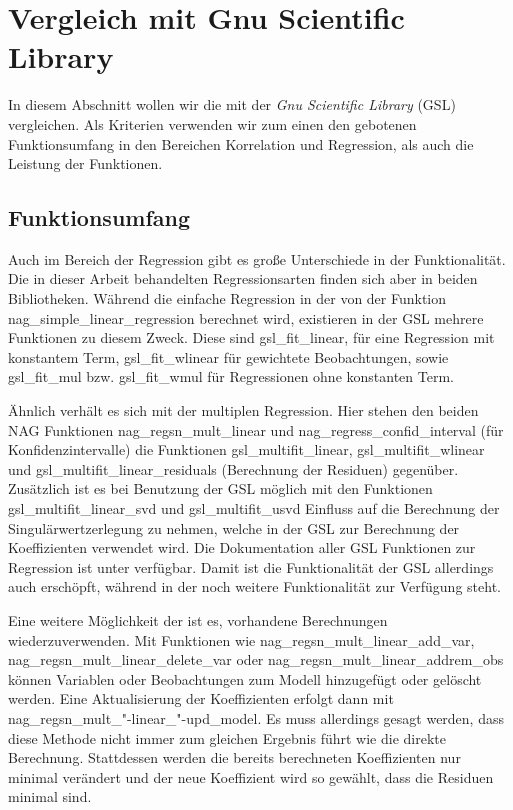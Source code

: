 \section{Vergleich mit Gnu Scientific Library}

In diesem Abschnitt wollen wir die \naglib mit der {\it Gnu Scientific Library} (GSL) vergleichen.
Als Kriterien verwenden wir zum einen den gebotenen Funktionsumfang in den Bereichen Korrelation und Regression, als auch die Leistung der Funktionen.


\subsection{Funktionsumfang}
\label{sec:funktionsumfang}


Auch im Bereich der Regression gibt es große Unterschiede in der Funktionalität.
Die in dieser Arbeit behandelten Regressionsarten finden sich aber in beiden Bibliotheken.
Während die einfache Regression in der \naglib von der Funktion nag\_simple\_linear\_regression berechnet wird, existieren in der GSL mehrere Funktionen zu diesem Zweck.
Diese sind gsl\_fit\_linear, für eine Regression mit konstantem Term, gsl\_fit\_wlinear für gewichtete Beobachtungen, sowie gsl\_fit\_mul bzw. gsl\_fit\_wmul für Regressionen ohne konstanten Term.

Ähnlich verhält es sich mit der multiplen Regression.
Hier stehen den beiden NAG Funktionen nag\_regsn\_mult\_linear und nag\_regress\_confid\_interval (für Konfidenzintervalle) die Funktionen  gsl\_multifit\_linear, gsl\_multifit\_wlinear und gsl\_multifit\_linear\_residuals (Berechnung der Residuen) gegenüber.
Zusätzlich ist es bei Benutzung der GSL möglich mit den Funktionen gsl\_multifit\_linear\_svd und gsl\_multifit\_usvd Einfluss auf die Berechnung der Singulärwertzerlegung zu nehmen, welche in der GSL zur Berechnung der Koeffizienten verwendet wird.
Die Dokumentation aller GSL Funktionen zur Regression ist unter \cite{FreeSoftwareFoundation2011} verfügbar.
Damit ist die Funktionalität der GSL allerdings auch erschöpft, während in der \naglib noch weitere Funktionalität zur Verfügung steht.

Eine weitere Möglichkeit der \naglib ist es, vorhandene Berechnungen wiederzuverwenden.
Mit Funktionen wie nag\_regsn\_mult\_linear\_add\_var, nag\_regsn\_mult\_linear\_delete\_var oder nag\_regsn\_mult\_linear\_addrem\_obs können Variablen oder Beobachtungen zum Modell hinzugefügt oder gelöscht werden.
Eine Aktualisierung der Koeffizienten erfolgt dann mit nag\_regsn\_mult\_"-linear\_"-upd\_model.
Es muss allerdings gesagt werden, dass diese Methode nicht immer zum gleichen Ergebnis führt wie die direkte Berechnung.
Stattdessen werden die bereits berechneten Koeffizienten nur minimal verändert und der neue Koeffizient wird so gewählt, dass die Residuen minimal sind. 

